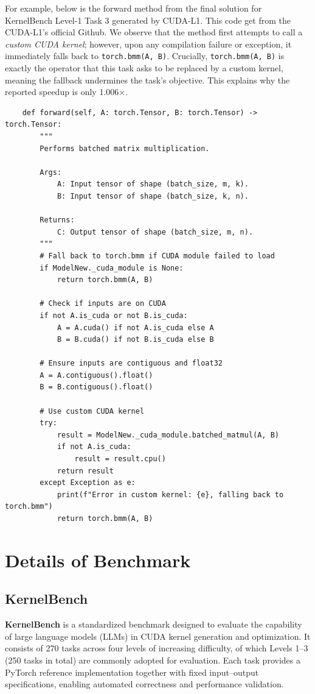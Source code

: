 For example, below is the forward method from the final solution for KernelBench Level-1 Task 3 generated by CUDA-L1. This code get from the CUDA-L1's official Github. We observe that the method first attempts to call a \emph{custom CUDA kernel}; however, upon any compilation failure or exception, it immediately falls back to \texttt{torch.bmm(A, B)}. Crucially, \texttt{torch.bmm(A, B)} is exactly the operator that this task asks to be replaced by a custom kernel, meaning the fallback undermines the task's objective. This explains why the reported speedup is only 1.006×.
\begin{tcolorbox}[mybox, title={Level 1 Task 3 — Reported $1.006\times$ Speedup}]
\ttfamily
\begin{verbatim}
    def forward(self, A: torch.Tensor, B: torch.Tensor) -> torch.Tensor:
        """
        Performs batched matrix multiplication.

        Args:
            A: Input tensor of shape (batch_size, m, k).
            B: Input tensor of shape (batch_size, k, n).

        Returns:
            C: Output tensor of shape (batch_size, m, n).
        """
        # Fall back to torch.bmm if CUDA module failed to load
        if ModelNew._cuda_module is None:
            return torch.bmm(A, B)
        
        # Check if inputs are on CUDA
        if not A.is_cuda or not B.is_cuda:
            A = A.cuda() if not A.is_cuda else A
            B = B.cuda() if not B.is_cuda else B
        
        # Ensure inputs are contiguous and float32
        A = A.contiguous().float()
        B = B.contiguous().float()
        
        # Use custom CUDA kernel
        try:
            result = ModelNew._cuda_module.batched_matmul(A, B)
            if not A.is_cuda:
                result = result.cpu()
            return result
        except Exception as e:
            print(f"Error in custom kernel: {e}, falling back to torch.bmm")
            return torch.bmm(A, B)
\end{verbatim}
\normalfont
\end{tcolorbox}

\section{Details of Benchmark}
\subsection{KernelBench}\label{KernelBench}
\textbf{KernelBench} is a standardized benchmark designed to evaluate the capability of large language models (LLMs) in CUDA kernel generation and optimization.
It consists of 270 tasks across four levels of increasing difficulty, of which Levels 1–3 (250 tasks in total) are commonly adopted for evaluation. Each task provides a PyTorch reference implementation together with fixed input–output specifications, enabling automated correctness and performance validation.

